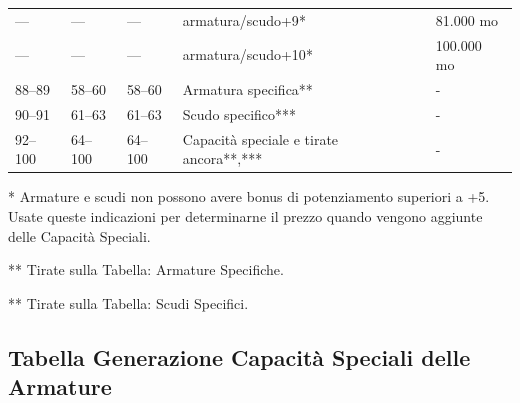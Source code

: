 \documentclass[a4paper,11pt,twoside,openany]{book}
\begin{document}
\begin{tabularx}{0.95\textwidth}{XXXXX}
	---             & ---            & ---               & armatura/scudo+9{*}               & 81.000 mo\\
	---             & ---            & ---               & armatura/scudo+10{*}              & 100.000 mo\\
	88--89          & 58--60         & 58--60            & Armatura specifica{*}{*}          & -\\
	90--91          & 61--63         & 61--63            & Scudo specifico{*}{*}{*}          & -\\
	92--100         & 64--100        & 64--100           & Capacità speciale e tirate ancora{*}{*},{*}{*}{*} & -\\
\end{tabularx}

{*} Armature e scudi non possono avere bonus di potenziamento superiori a +5. Usate queste indicazioni per determinarne il prezzo quando vengono aggiunte delle Capacità Speciali.

	{*}{*} Tirate sulla Tabella: Armature Specifiche.

	{*}{*} Tirate sulla Tabella: Scudi Specifici.



\subsection{Tabella Generazione Capacità Speciali delle Armature}

\label{tabella-generazione-capacita-speciali-delle-armature}
\end{document}
